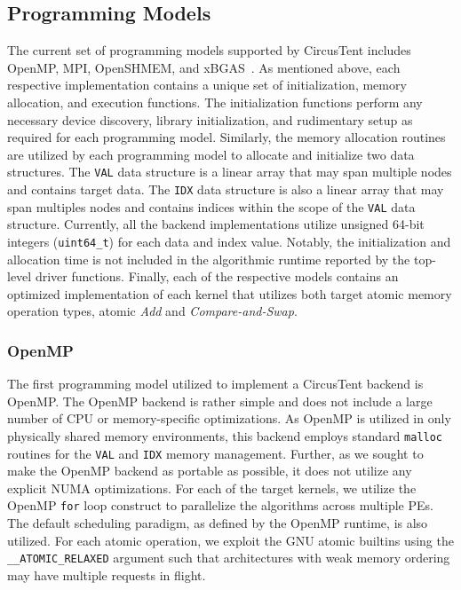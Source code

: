 \subsection{Programming Models}
\label{subsec:programming_models}

The current set of programming models supported by CircusTent includes OpenMP, MPI, OpenSHMEM, and xBGAS~\cite{leidel2018xbgas}.
As mentioned above, each respective implementation contains a unique set of initialization, memory allocation, and execution functions.
The initialization functions perform any necessary device discovery, library initialization, and rudimentary setup as required for each programming model.
Similarly, the memory allocation routines are utilized by each programming model to allocate and initialize two data structures.
The \texttt{VAL} data structure is a linear array that may span multiple nodes and contains target data.
The \texttt{IDX} data structure is also a linear array that may span multiples nodes and contains indices within the scope of the \texttt{VAL} data structure.
Currently, all the backend implementations utilize unsigned 64-bit integers (\texttt{uint64\_t}) for each data and index value.  
Notably, the initialization and allocation time is not included in the algorithmic runtime reported by the top-level driver functions.
Finally, each of the respective models contains an optimized implementation of each kernel that utilizes both target atomic memory operation types, atomic \textit{Add} and \textit{Compare-and-Swap}.

\subsubsection{OpenMP}
\label{subsubsec:openmp}

The first programming model utilized to implement a CircusTent backend is OpenMP.  
The OpenMP backend is rather simple and does not include a large number of CPU or memory-specific optimizations.
As OpenMP is utilized in only physically shared memory environments, this backend employs standard \texttt{malloc} routines for the \texttt{VAL} and \texttt{IDX} memory management.
Further, as we sought to make the OpenMP backend as portable as possible, it does not utilize any explicit NUMA optimizations. 
For each of the target kernels, we utilize the OpenMP \texttt{for} loop construct to parallelize the algorithms across multiple PEs.
The default scheduling paradigm, as defined by the OpenMP runtime, is also utilized.
For each atomic operation, we exploit the GNU atomic builtins using the \texttt{\_\_ATOMIC\_RELAXED} argument such that architectures with weak memory ordering may have multiple requests in flight.  

